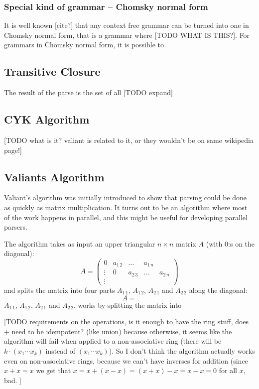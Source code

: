 \documentclass{article}
\begin{document}
\subsubsection{Special kind of grammar -- Chomsky normal form}
It is well known [cite?] that any context free grammar can be turned into one in Chomsky normal form, that is a grammar where [TODO WHAT IS THIS?]. For grammars in Chomsky normal form, it is possible to
\subsection{Transitive Closure}
The result of the parse is the set of all [TODO expand]
\subsection{CYK Algorithm}
[TODO what is it? valiant is related to it, or they wouldn't be on same wikipedia page!]

\subsection{Valiants Algorithm}
Valiant's algorithm was initially introduced to show that parsing could be done as quickly as matrix multiplication. It turns out to be an algorithm where most of the work happens in parallel, and this might be useful for developing parallel parsers.

The algorithm takes as input an upper triangular $n \times n$ matrix $A$ (with $0$:s on the diagonal): 
\begin{equation}
A = 
\begin{pmatrix}
0 & a_{1\, 2} & \hdots & a_{1\, n} \\
\vdots & 0 & a_{2\,3} &  \hdots & a_{2\,n}\\
\vdots &
\end{pmatrix}
\end{equation}
and splits the matrix into four parts $A_{1\, 1}$, $A_{1\,2}$, $A_{2\,1}$ and $A_{2\,2}$ along the diagonal: 
\begin{equation}
A = 
\end{equation}
$A_{1\, 1}$, $A_{1\,2}$, $A_{2\,1}$ and $A_{2\,2}$. works by splitting the matrix into 

[TODO requirements on the operations, is it enough to have the ring stuff, does $+$ need to be idempotent? (like union) because otherwise, it seems like the algorithm will fail when applied to a non-associative ring (there will be $k\cdot (x_1\cdots x_k)$ instead of $(x_1\cdots x_k)$). So I don't think the algorithm actually works even on non-associative rings, because we can't have inverses for addition (since $x + x = x$ we get that $x = x + (x - x) = (x + x) - x = x - x = 0$ for all $x$, bad. ]
\end{document}

